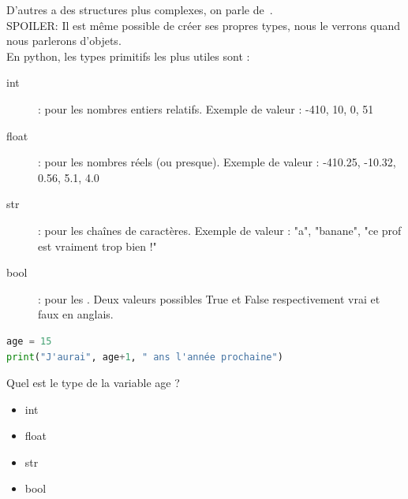 D'autres a des structures plus complexes, on parle de~.\\

{\color{red}\textsc{SPOILER}}: Il est même possible de créer ses propres types, nous le verrons quand nous parlerons d'objets.\\

En python, les types primitifs les plus utiles sont :
\begin{description}
    \item[int]: pour les nombres entiers relatifs. Exemple de valeur : -410, 10, 0, 51
    \item[float]: pour les nombres réels (ou presque). Exemple de valeur : -410.25, -10.32, 0.56, 5.1, 4.0
    \item[str]: pour les chaînes de caractères. Exemple de valeur : "a", "banane", "ce prof est vraiment trop bien !"
    \item[bool]: pour les . Deux valeurs possibles True et False respectivement vrai et faux en anglais.
\end{description}
\begin{Quizz}
    \begin{lstlisting}[style=pythonstyle, language=Python]
age = 15 
print("J'aurai", age+1, " ans l'année prochaine")\end{lstlisting}
    Quel est le type de la variable age ?
    \begin{itemize}
    \renewcommand{\labelitemi}{$\square$}
    \item int
    \item float
    \item str
    \item bool
    \end{itemize}
\end{Quizz}
\newpage
